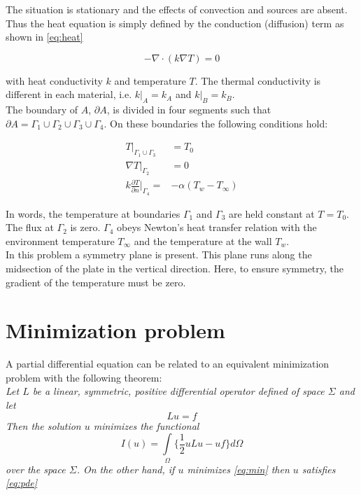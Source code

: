 \documentclass[10pt,a4paper]{article}
\begin{document}
The situation is stationary and the effects of convection and sources are absent. Thus the heat equation is simply defined by the conduction (diffusion) term as shown in \eqref{eq:heat}

\begin{equation}\label{eq:heat}
	-\nabla \cdot (k \nabla T) = 0
\end{equation}

with heat conductivity $k$ and temperature $T$. The thermal conductivity is different in each material, i.e. $ k|_A = k_A $ and $k|_B = k_B $.\\

The boundary of $A$, $\partial A$,  is divided in four segments such that $\partial A = \Gamma_1 \cup  \Gamma_2 \cup  \Gamma_3 \cup  \Gamma_4$. On these boundaries the following conditions hold:

\begin{align}
T\rvert_{\Gamma_1\cup\Gamma_3}& = T_0 \label{eq:bc13}\\
\nabla T\rvert_{\Gamma_2} &= 0\label{eq:bc2}\\
k\frac{\partial T}{\partial n}\rvert_{\Gamma_4}=&-\alpha(T_w - T_{\infty})\label{eq:bc4}
\end{align}

In words, the temperature at boundaries $\Gamma_1$ and $\Gamma_3$ are held constant at $T=T_0$. The flux at $\Gamma_2$ is zero. $\Gamma_4$ obeys Newton's heat transfer relation with the environment temperature $T_{\infty}$ and the temperature at the wall $T_w$.\\

In this problem a symmetry plane is present. This plane runs along the midsection of the plate in the vertical direction. Here, to ensure symmetry, the gradient of the temperature must be zero.

\section{Minimization problem}
A partial differential equation can be related to an equivalent minimization problem with the following theorem\cite{Kan2008}:\\

\textit{Let $L$ be a linear, symmetric, positive differential operator defined of space $\Sigma$ and let}
\begin{equation}\label{eq:pde}
Lu=f
\end{equation}
\textit{Then the solution $u$ minimizes the functional}
\begin{equation}\label{eq:min}
I(u) = \underset{\Omega}{\int}\{\frac{1}{2}uLu-uf\}d\Omega
\end{equation}  \textit{over the space $\Sigma$. On the other hand, if $u$ minimizes \eqref{eq:min} then $u$ satisfies \eqref{eq:pde}} \\
\end{document}
